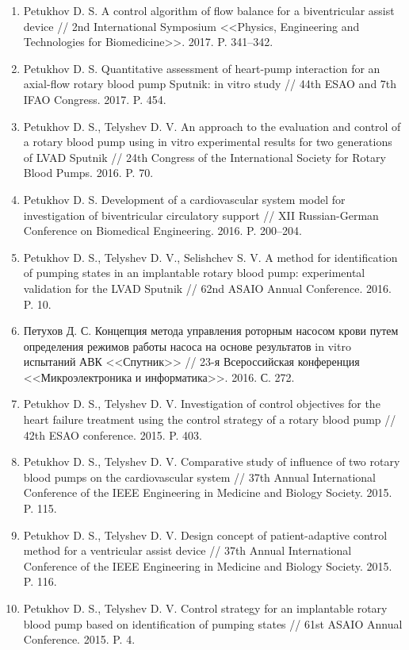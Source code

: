 \renewcommand{\baselinestretch}{1.5}
\renewcommand{\arraystretch}{1.5}

\begin{enumerate}[leftmargin=25pt, itemsep=12pt]  %
  \item Petukhov D. S. A control algorithm of flow balance for a biventricular assist device // 2nd International Symposium <<Physics, Engineering and Technologies for Biomedicine>>. 2017. P. 341--342.
  \item Petukhov D. S. Quantitative assessment of heart-pump interaction for an axial-flow rotary blood pump Sputnik: in vitro study // 44th ESAO and 7th IFAO Congress. 2017. P. 454.
  \item Petukhov D. S., Telyshev D. V. An approach to the evaluation and control of a rotary blood pump using in vitro experimental results for two generations of LVAD Sputnik // 24th Congress of the International Society for Rotary Blood Pumps. 2016. P. 70.
  \item Petukhov D. S. Development of a cardiovascular system model for investigation of biventricular circulatory support // XII Russian-German Conference on Biomedical Engineering. 2016. P. 200--204.
  \item Petukhov D. S., Telyshev D. V., Selishchev S. V. A method for identification of pumping states in an implantable rotary blood pump: experimental validation for the LVAD Sputnik // 62nd ASAIO Annual Conference. 2016. P. 10.
  \item Петухов Д. С. Концепция метода управления роторным насосом крови путем определения режимов работы насоса на основе результатов in vitro испытаний АВК <<Спутник>> // 23-я Всероссийская конференция <<Микроэлектроника и информатика>>. 2016. С. 272.
  \item Petukhov D. S., Telyshev D. V. Investigation of control objectives for the heart failure treatment using the control strategy of a rotary blood pump // 42th ESAO conference. 2015. P. 403.
  \item Petukhov D. S., Telyshev D. V. Comparative study of influence of two rotary blood pumps on the cardiovascular system // 37th Annual International Conference of the IEEE Engineering in Medicine and Biology Society. 2015. P. 115.
  \item Petukhov D. S., Telyshev D. V. Design concept of patient-adaptive control method for a ventricular assist device // 37th Annual International Conference of the IEEE Engineering in Medicine and Biology Society. 2015. P. 116.
  \item Petukhov D. S., Telyshev D. V. Control strategy for an implantable rotary blood pump based on identification of pumping states // 61st ASAIO Annual Conference. 2015. P. 4.

\end{enumerate}
